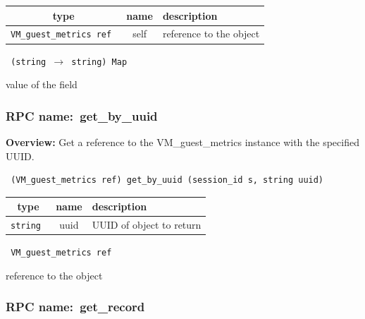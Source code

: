  
\vspace{0.3cm}
\begin{tabular}{|c|c|p{7cm}|}
 \hline
{\bf type} & {\bf name} & {\bf description} \\ \hline
{\tt VM\_guest\_metrics ref } & self & reference to the object \\ \hline 

\end{tabular}

\vspace{0.3cm}

{\tt 
(string $\rightarrow$ string) Map
}


value of the field
\vspace{0.3cm}
\vspace{0.3cm}
\vspace{0.3cm}
\subsubsection{RPC name:~get\_by\_uuid}

{\bf Overview:} 
Get a reference to the VM\_guest\_metrics instance with the specified UUID.

\begin{verbatim} (VM_guest_metrics ref) get_by_uuid (session_id s, string uuid)\end{verbatim}



 
\vspace{0.3cm}
\begin{tabular}{|c|c|p{7cm}|}
 \hline
{\bf type} & {\bf name} & {\bf description} \\ \hline
{\tt string } & uuid & UUID of object to return \\ \hline 

\end{tabular}

\vspace{0.3cm}

{\tt 
VM\_guest\_metrics ref
}


reference to the object
\vspace{0.3cm}
\vspace{0.3cm}
\vspace{0.3cm}
\subsubsection{RPC name:~get\_record}

